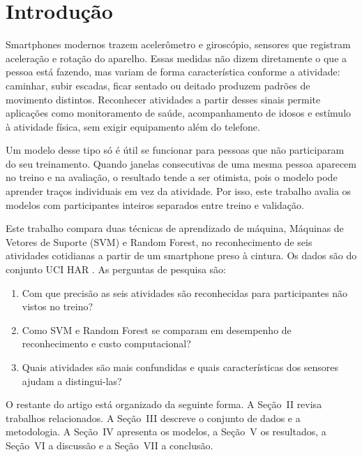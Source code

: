 \section{Introdução}

Smartphones modernos trazem acelerômetro e giroscópio, sensores que registram aceleração e rotação do aparelho. Essas medidas não dizem diretamente o que a pessoa está fazendo, mas variam de forma característica conforme a atividade: caminhar, subir escadas, ficar sentado ou deitado produzem padrões de movimento distintos. Reconhecer atividades a partir desses sinais permite aplicações como monitoramento de saúde, acompanhamento de idosos e estímulo à atividade física, sem exigir equipamento além do telefone.

Um modelo desse tipo só é útil se funcionar para pessoas que não participaram do seu treinamento. Quando janelas consecutivas de uma mesma pessoa aparecem no treino e na avaliação, o resultado tende a ser otimista, pois o modelo pode aprender traços individuais em vez da atividade. Por isso, este trabalho avalia os modelos com participantes inteiros separados entre treino e validação.

Este trabalho compara duas técnicas de aprendizado de máquina, Máquinas de Vetores de Suporte (SVM) e Random Forest, no reconhecimento de seis atividades cotidianas a partir de um smartphone preso à cintura. Os dados são do conjunto UCI HAR \cite{anguita2013,uci_har}. As perguntas de pesquisa são:

\begin{enumerate}
  \item Com que precisão as seis atividades são reconhecidas para participantes não vistos no treino?
  \item Como SVM e Random Forest se comparam em desempenho de reconhecimento e custo computacional?
  \item Quais atividades são mais confundidas e quais características dos sensores ajudam a distingui-las?
\end{enumerate}

O restante do artigo está organizado da seguinte forma. A Seção~II revisa trabalhos relacionados. A Seção~III descreve o conjunto de dados e a metodologia. A Seção~IV apresenta os modelos, a Seção~V os resultados, a Seção~VI a discussão e a Seção~VII a conclusão.
